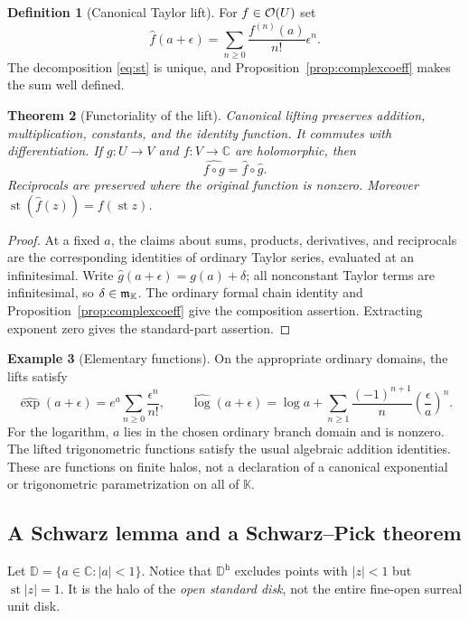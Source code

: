 \documentclass[11pt,a4paper]{article}
\newtheorem{theorem}{Theorem}[section]
\theoremstyle{definition}\newtheorem{definition}[theorem]{Definition}
\newtheorem{example}[theorem]{Example}
\theoremstyle{remark}\newtheorem{remark}[theorem]{Remark}
\newcommand{\K}{\mathbb K}
\newcommand{\C}{\mathbb C}\newcommand{\R}{\mathbb R}\newcommand{\N}{\mathbb N}\newcommand{\Z}{\mathbb Z}
\newcommand{\st}{\operatorname{st}}\newcommand{\supp}{\operatorname{supp}}
\newcommand{\ev}[1]{\widehat{#1}}
\newcommand{\halo}[1]{#1^{\mathrm h}}
\numberwithin{equation}{section}
\begin{document}
\begin{definition}[Canonical Taylor lift]
For $f\in\mathcal O(U)$ set
\begin{equation}\label{eq:canonicallift}
 \ev f(a+\epsilon)=\sum_{n\geq0}\frac{f^{(n)}(a)}{n!}\epsilon^n.
\end{equation}
The decomposition \eqref{eq:st} is unique, and Proposition~\ref{prop:complexcoeff} makes the sum well defined.
\end{definition}

\begin{theorem}[Functoriality of the lift]\label{thm:canonicalfunctor}
Canonical lifting preserves addition, multiplication, constants, and the identity function. It commutes with differentiation. If $g:U\to V$ and $f:V\to\C$ are holomorphic, then
\[
 \ev{f\circ g}=\ev f\circ\ev g.
\]
Reciprocals are preserved where the original function is nonzero. Moreover $\st(\ev f(z))=f(\st z)$.
\end{theorem}
\begin{proof}
At a fixed $a$, the claims about sums, products, derivatives, and reciprocals are the corresponding identities of ordinary Taylor series, evaluated at an infinitesimal. Write $\ev g(a+\epsilon)=g(a)+\delta$; all nonconstant Taylor terms are infinitesimal, so $\delta\in\infinit$. The ordinary formal chain identity and Proposition~\ref{prop:complexcoeff} give the composition assertion. Extracting exponent zero gives the standard-part assertion.
\end{proof}

\begin{example}[Elementary functions]
On the appropriate ordinary domains, the lifts satisfy
\[
 \ev{\exp}(a+\epsilon)=e^a\sum_{n\geq0}\frac{\epsilon^n}{n!},\qquad
 \ev{\log}(a+\epsilon)=\log a+
 \sum_{n\geq1}\frac{(-1)^{n+1}}n\left(\frac\epsilon a\right)^n.
\]
For the logarithm, $a$ lies in the chosen ordinary branch domain and is nonzero. The lifted trigonometric functions satisfy the usual algebraic addition identities. These are functions on finite halos, not a declaration of a canonical exponential or trigonometric parametrization on all of $\K$.
\end{example}

\subsection{A Schwarz lemma and a Schwarz--Pick theorem}
Let $\mathbb D=\{a\in\C:|a|<1\}$. Notice that $\halo{\mathbb D}$ excludes points with $|z|<1$ but $\st|z|=1$. It is the halo of the \emph{open standard disk}, not the entire fine-open surreal unit disk.
\end{document}

